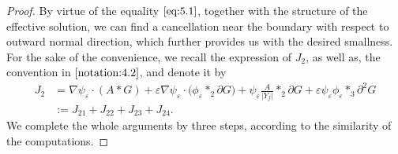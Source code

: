 \documentclass[13pt,CJK]{article}
\theoremstyle{plain}                       %
\theoremstyle{remark}
\numberwithin{equation}{section}
\begin{document}
\begin{proof}
By virtue of the equality $\eqref{eq:5.1}$, together with
the structure of the effective solution, we can find a cancellation near the boundary with respect to
outward normal direction, which further provides us with the desired smallness.
For the sake of the convenience, we recall the expression of $J_2$, as well as, the convention in $\eqref{notation:4.2}$,
and denote it by
\begin{equation}\label{f:5.11}
\begin{aligned}
  J_2&=\nabla \psi_{\varepsilon}
  \cdot (A\ast G)
  +\varepsilon\nabla \psi_{\varepsilon}\cdot
  \big(\phi_{\varepsilon}\ast_2 \partial G\big)
  +\psi_{\varepsilon}\frac{A}{|Y_f|}\ast_2 \partial G
  +\varepsilon\psi_{\varepsilon}\phi_{\varepsilon}
  \ast_3\partial^2G\\
  &:=J_{21}+J_{22}+J_{23}+J_{24}.
  \end{aligned}
\end{equation}
We complete the whole arguments by three steps, according to the similarity of the computations.



\end{proof}
\end{document}
